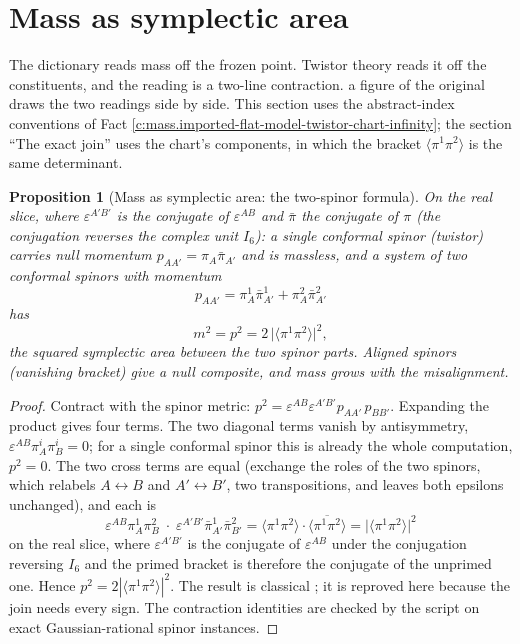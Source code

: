 \documentclass[11pt]{article}
\newtheorem{proposition}[theorem]{Proposition}
\theoremstyle{definition}
\theoremstyle{plain}
\newcommand{\changedmark}[2]{\marginpar{\raggedright\scriptsize\color{#1}#2}}
\providecommand{\br}{}\renewcommand{\br}[1]{\langle #1\rangle}
\begin{document}
\section{Mass as symplectic area}

\label{c:note.mass.setting-mass-symplectic-area}
The dictionary reads mass off the frozen point. Twistor theory reads it off the constituents, and the reading is a two-line contraction. a figure of the original draws the two readings side by side. This section uses the abstract-index conventions of Fact \ref{c:mass.imported-flat-model-twistor-chart-infinity}; the section ``The exact join'' uses the chart's components, in which the bracket $\br{\pi^{1}\pi^{2}}$ is the same determinant.

\begin{proposition}[Mass as symplectic area: the two-spinor formula]\label{c:mass.mass-symplectic-area-two-twistor-formula}
\changedmark{gray}{reworded}
On the real slice, where $\varepsilon^{A'B'}$ is the conjugate of $\varepsilon^{AB}$ and $\bar\pi$ the conjugate of $\pi$ (the conjugation reverses the complex unit $I_{6}$): a single conformal spinor (twistor) carries null momentum $p_{AA'} = \pi_{A}\bar\pi_{A'}$ and is massless, and a system of two conformal spinors with momentum
\[
p_{AA'} = \pi^{1}_{A}\bar\pi^{1}_{A'} + \pi^{2}_{A}\bar\pi^{2}_{A'}
\]
has
\begin{equation}
m^{2} = p^{2} = 2\,\bigl|\br{\pi^{1}\pi^{2}}\bigr|^{2},
\end{equation}
the squared symplectic area between the two spinor parts. Aligned spinors (vanishing bracket) give a null composite, and mass grows with the misalignment.
\end{proposition}
\begin{proof}
Contract with the spinor metric: $p^{2} = \varepsilon^{AB}\varepsilon^{A'B'} p_{AA'}\, p_{BB'}$. Expanding the product gives four terms. The two diagonal terms vanish by antisymmetry, $\varepsilon^{AB}\pi^{i}_{A}\pi^{i}_{B} = 0$; for a single conformal spinor this is already the whole computation, $p^{2} = 0$. The two cross terms are equal (exchange the roles of the two spinors, which relabels $A \leftrightarrow B$ and $A' \leftrightarrow B'$, two transpositions, and leaves both epsilons unchanged), and each is
\[
\varepsilon^{AB}\pi^{1}_{A}\pi^{2}_{B}\;\cdot\;\varepsilon^{A'B'}\bar\pi^{1}_{A'}\bar\pi^{2}_{B'}
= \br{\pi^{1}\pi^{2}}\cdot\overline{\br{\pi^{1}\pi^{2}}}
= \bigl|\br{\pi^{1}\pi^{2}}\bigr|^{2}
\]
on the real slice, where $\varepsilon^{A'B'}$ is the conjugate of $\varepsilon^{AB}$ under the conjugation reversing $I_{6}$ and the primed bracket is therefore the conjugate of the unprimed one. Hence $p^{2} = 2|\br{\pi^{1}\pi^{2}}|^{2}$. The result is classical \cite{Hughston1979}; it is reproved here because the join needs every sign. The contraction identities are checked by the script on exact Gaussian-rational spinor instances.

\end{proof}
\end{document}

